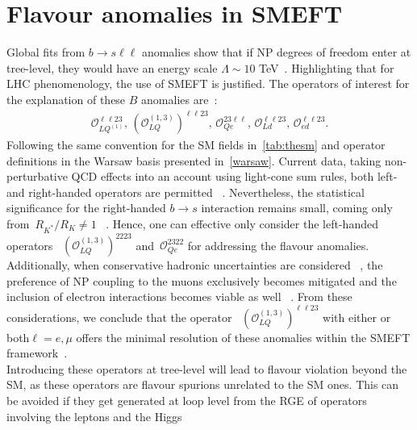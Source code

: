 \section{Flavour anomalies in SMEFT }
\label{sec:theory}
Global fits from $ b \to s \ell \ell$ anomalies show that  if NP degrees of freedom  enter at tree-level, they would have an energy scale $ \Lambda \sim 10$ TeV~\cite{DAmico:2017mtc,Geng:2017svp,Capdevila:2017bsm,Ciuchini:2017mik,Hiller:2017bzc}. Highlighting that for LHC phenomenology, the use of SMEFT is justified.  The operators of interest for the explanation of these $B$ anomalies are~\cite{Celis:2017doq,Ciuchini:2019usw,Aebischer:2019mlg}: 
\begin{eqnarray}
	\label{eq:tree_LUV_SMEFT}
	\mathcal{O}_{LQ^{(1)}}^{\ell \ell 23}, \,	(\mathcal{O}_{LQ}^{(1,3)})^{\ell \ell 23}, \, \mathcal{O}_{Qe}^{23 \ell \ell}, \,  \mathcal{O}_{Ld}^{ \ell \ell 23}, \, \mathcal{O}_{ed}^{\ell \ell 23 }.
\end{eqnarray}
Following the same convention for the SM fields in~\autoref{tab:thesm} and operator definitions in the Warsaw basis presented in~\autoref{warsaw}.  Current data, taking non-perturbative QCD effects into an account using light-cone sum rules, both left- and right-handed operators are permitted ~\cite{Ciuchini:2019usw,Alok:2019ufo,Alguero:2019ptt,Kowalska:2019ley}. Nevertheless, the statistical significance for the right-handed $b \to s$ interaction remains small, coming only from~$R_{K^{*}}/R_{K} \neq 1$ ~\cite{Hiller:2017bzc,Ciuchini:2019usw}. Hence, one can effective only consider the left-handed operators ~$(	\mathcal{O}_{LQ}^{(1,3)} )^{22 23}$ and~$\mathcal{O}_{Qe}^{23 22}$ for addressing the flavour anomalies. Additionally, when conservative hadronic uncertainties are considered ~\cite{Jager:2014rwa,Ciuchini:2015qxb,Arbey:2018ics}, the preference of NP coupling to the muons exclusively becomes mitigated and the inclusion of electron interactions becomes viable as well ~\cite{Ciuchini:2017mik}. From these considerations, we conclude that the operator ~$(	\mathcal{O}_{LQ}^{(1,3)} )^{\ell \ell 23}$ with either or both$ \ell=e, \mu$  offers the minimal resolution of these anomalies within the SMEFT framework~\cite{Ciuchini:2019usw}.\\
Introducing these operators at tree-level will lead to flavour violation beyond the SM, as these operators are flavour spurions unrelated to the SM ones. This can be avoided if they get generated at loop level from the RGE of operators involving the leptons and the Higgs~\cite{Celis:2017doq} 
